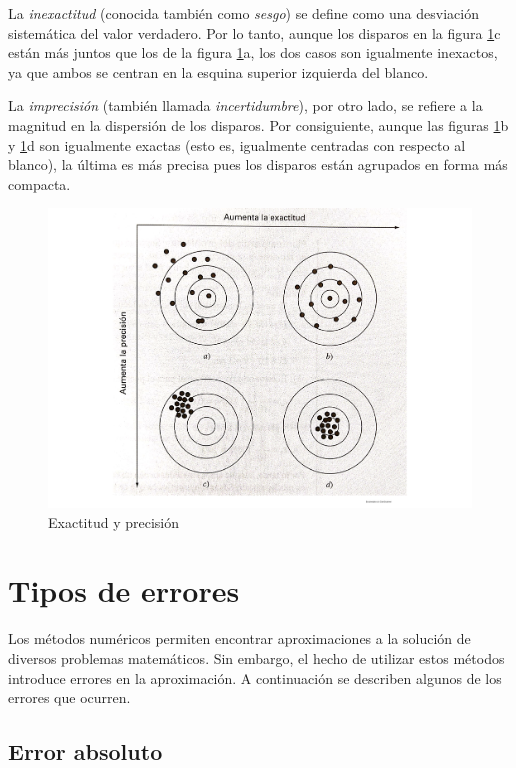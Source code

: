 La \textit{inexactitud} (conocida también como \textit{sesgo}) se define como una desviación sistemática del valor verdadero. Por lo tanto, aunque 
los disparos en la figura \ref{fig:exactitudPrecision}c están más juntos que los de la figura \ref{fig:exactitudPrecision}a, los dos casos son
igualmente inexactos, ya que ambos se centran en la esquina superior izquierda del blanco. 

La \textit{imprecisión} (también llamada \textit{incertidumbre}),
por otro lado, se refiere a la magnitud en la dispersión de los disparos. Por consiguiente, aunque las figuras \ref{fig:exactitudPrecision}b y 
\ref{fig:exactitudPrecision}d son igualmente exactas (esto es, igualmente centradas con respecto al blanco), la última es más precisa pues los 
disparos están agrupados en forma más compacta.

\begin{figure}[H]
	\centering
	\includegraphics[scale=0.4]{img/exactitudPrecision.pdf}
	\caption{Exactitud y precisión}
 	\label{fig:exactitudPrecision}
\end{figure}


\section{Tipos de errores}
Los métodos numéricos permiten encontrar aproximaciones a la solución de diversos problemas matemáticos. Sin embargo, el hecho de utilizar estos métodos 
introduce errores en la aproximación. A continuación se describen algunos de los errores que ocurren.

\subsection{Error absoluto}

